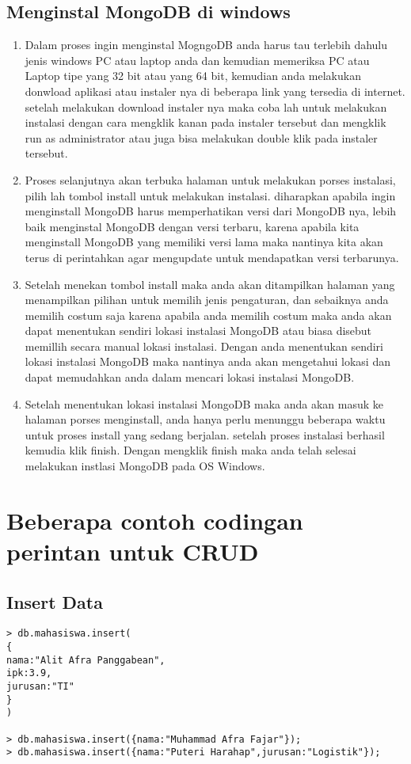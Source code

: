 \subsection {Menginstal MongoDB di windows}
\begin {enumerate}
\item
	Dalam proses ingin menginstal MogngoDB anda harus tau terlebih dahulu jenis windows PC atau laptop anda dan kemudian memeriksa PC atau Laptop tipe yang 32 bit atau yang 64 bit, kemudian anda melakukan donwload aplikasi atau instaler nya di beberapa link yang tersedia di internet. setelah melakukan download instaler nya maka coba lah untuk melakukan instalasi dengan cara mengklik kanan pada instaler tersebut dan mengklik run as administrator atau juga bisa melakukan double klik pada instaler tersebut.
\item
	Proses selanjutnya akan terbuka halaman untuk melakukan porses instalasi, pilih lah tombol install untuk melakukan instalasi. diharapkan apabila ingin menginstall MongoDB harus memperhatikan versi dari MongoDB nya, lebih baik menginstal MongoDB dengan versi terbaru, karena apabila kita menginstall MongoDB yang memiliki versi lama maka nantinya kita akan terus di perintahkan agar mengupdate untuk mendapatkan versi terbarunya.
\item
	Setelah menekan tombol install maka anda akan ditampilkan halaman yang menampilkan pilihan untuk memilih jenis pengaturan, dan sebaiknya anda memilih costum saja karena apabila anda memilih costum maka anda akan dapat menentukan sendiri lokasi instalasi MongoDB atau biasa disebut memillih secara manual lokasi instalasi. Dengan anda menentukan sendiri lokasi instalasi MongoDB maka nantinya anda akan mengetahui lokasi dan dapat memudahkan anda dalam mencari lokasi instalasi MongoDB.
\item
	Setelah menentukan lokasi instalasi MongoDB maka anda akan masuk ke halaman porses menginstall, anda hanya perlu menunggu beberapa waktu untuk proses install yang sedang berjalan. setelah proses instalasi berhasil kemudia klik finish. Dengan mengklik finish maka anda telah selesai melakukan instlasi MongoDB pada OS Windows.
\end {enumerate}


\section {Beberapa contoh codingan perintan untuk CRUD}
\subsection {Insert Data}
\begin{verbatim} 
> db.mahasiswa.insert(
{
nama:"Alit Afra Panggabean", 
ipk:3.9,
jurusan:"TI"
}
)

> db.mahasiswa.insert({nama:"Muhammad Afra Fajar"});
> db.mahasiswa.insert({nama:"Puteri Harahap",jurusan:"Logistik"});

\end{verbatim}

